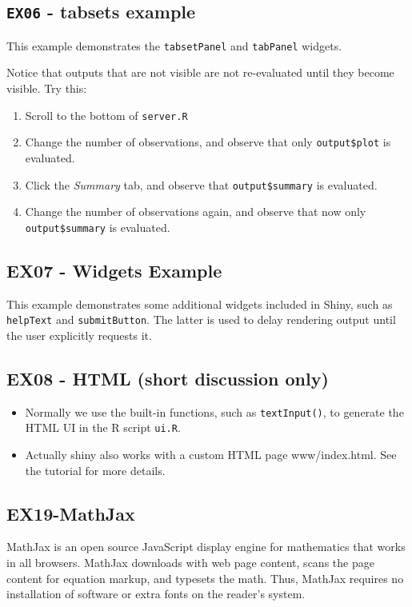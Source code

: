 \documentclass[12pt]{article}
\begin{document}
\subsection{\texttt{EX06} - tabsets example}

This example demonstrates the \texttt{tabsetPanel} and \texttt{tabPanel} widgets.

Notice that outputs that are not visible are not re-evaluated until they become visible. Try this:

\begin{enumerate}
\item Scroll to the bottom of \texttt{server.R}
\item Change the number of observations, and observe that only \texttt{output\$plot} is evaluated.
\item Click the \textit{Summary} tab, and observe that \texttt{output\$summary} is evaluated.
\item Change the number of observations again, and observe that now only \texttt{output\$summary} is evaluated.
\end{enumerate}


\subsection{EX07 - Widgets Example}

This example demonstrates some additional widgets included in Shiny, such as \texttt{helpText} and \texttt{submitButton}. The latter is used to delay rendering output until the user explicitly requests it.

\subsection{EX08 - HTML (short discussion only)}

\begin{itemize}
\item Normally we use the built-in functions, such as \texttt{textInput()}, to generate the HTML UI in the R script \texttt{ui.R}. 
\item Actually shiny also works with a custom HTML page www/index.html. See the tutorial for more details.
\end{itemize}


\subsection{EX19-MathJax}
MathJax is an open source JavaScript display engine for mathematics that works in all browsers. MathJax downloads with web page content, scans the page content for equation markup, and typesets the math. Thus, MathJax requires no installation of software or extra fonts on the reader's system. 
\end{document}
